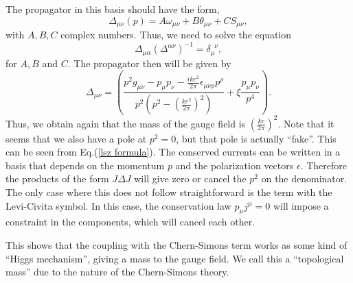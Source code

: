 \documentclass{article}
\begin{document}
The propagator in this basis should have the form,
\begin{equation}
	\Delta_{\mu\nu}(p)=A\omega_{\mu\nu}+B\theta_{\mu\nu}+CS_{\mu\nu}, 
\end{equation}
with $A,B,C$ complex numbers. Thus, we need to solve the equation 
\begin{equation}
	\Delta_{\mu\alpha}(\Delta^{\alpha\nu})^{-1}=\delta_\mu^{\;\;\nu},
\end{equation}
for $A,B$ and $C$. The propagator then will be given by 
\begin{equation}
	\Delta_{\mu\nu}=\left(\frac{p^2g_{\mu\nu}-p_\mu p_\nu-\frac{ike^2}{2\pi}\epsilon_{\mu\nu\rho}p^\rho}{p^2(p^2-(\frac{ke^2}{2\pi})^2)}+\xi\frac{p_\mu p_\nu}{p^4}\right).
\end{equation}
Thus, we obtain again that the mass of the gauge field is $\left(\frac{ke}{2\pi}\right)^2.$ Note that it seems that we also have a pole at $p^2=0$, but that pole is actually ``fake''. This can be seen from Eq.(\ref{lsz formula}). The conserved currents can be written in a basis that depends on the momentum $p$ and the polarization vectors $\epsilon$. Therefore the products of the form $J \Delta J$ will give zero or cancel the $p^2$ on the denominator. The only case where this does not follow straightforward is the term with the Levi-Civita symbol. In this case, the conservation law $p_\mu j^\mu=0$ will impose a constraint in the components, which will cancel each other. 


This shows that the coupling with the Chern-Simons term works as some kind of “Higgs mechanism”, giving a mass to the gauge field. We call this a “topological mass'' due to the nature of the Chern-Simons theory.  
\end{document}
